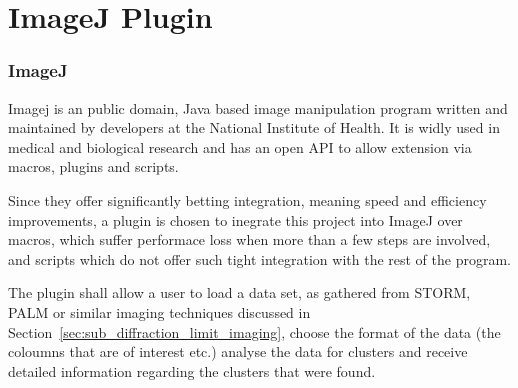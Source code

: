 
\part{ImageJ Plugin}
\label{part:imagej_plugin}

\section{ImageJ}
\label{sec:imagej}

Imagej is an public domain, Java based image manipulation program written and
maintained by developers at the National Institute of Health. It is widly used
in medical and biological research and has an open API to allow extension via
macros, plugins and scripts.

Since they offer significantly betting integration, meaning speed and
efficiency improvements, a plugin is chosen to inegrate this project into
ImageJ over macros, which suffer performace loss when more than a few steps are
involved, and scripts which do not offer such tight integration with the rest
of the program.

The plugin shall allow a user to load a data set, as gathered from STORM, PALM
or similar imaging techniques discussed in
Section~\ref{sec:sub_diffraction_limit_imaging}, choose the format of the data
(the coloumns that are of interest etc.) analyse the data for clusters and
receive detailed information regarding the clusters that were found.
